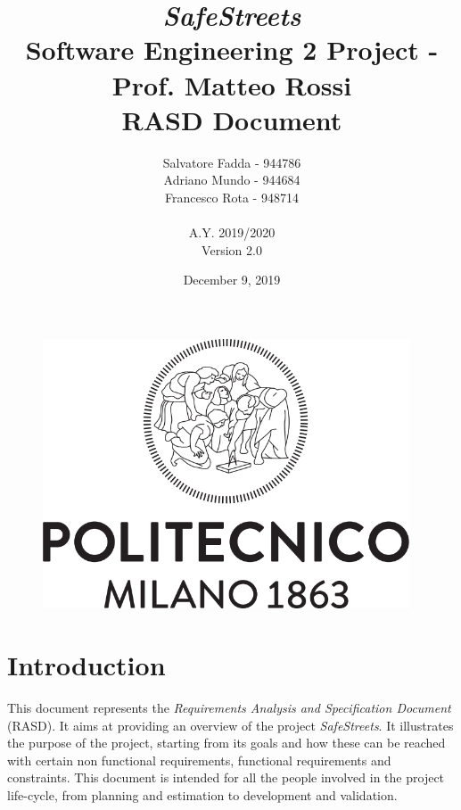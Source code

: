 \documentclass {article}
\begin{document}
\begin{figure}
\centering
	\includegraphics[height=8cm]{polimi_logo.png}
\end{figure}


\title {{\Huge \it SafeStreets} \\ \Large Software Engineering 2 Project - Prof. Matteo Rossi \\  {\bf RASD Document}
}
\author{Salvatore Fadda - 944786\\Adriano Mundo - 944684 \\ Francesco Rota - 948714
		\\ \\ A.Y. 2019/2020 \\ Version 2.0}
\date{December 9, 2019}



\maketitle
\newpage

	
\tableofcontents
\newpage


\section{Introduction}
This document represents the {\it Requirements Analysis and Specification Document} (RASD). It aims at providing an overview of the project {\it SafeStreets}. It illustrates the purpose of the project, starting from its goals and how these can be reached with certain non functional requirements, functional requirements and constraints. This document is intended for all the people involved in the project life-cycle, from planning and estimation to development and validation.
\end{document}
